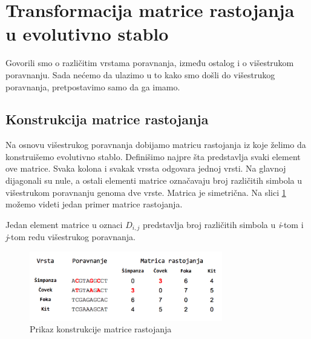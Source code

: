 \section{Transformacija matrice rastojanja u evolutivno stablo}
\label{sec:transformacijamatrice}

Govorili smo o različitim vrstama poravnanja, između ostalog i o višestrukom poravnanju. Sada nećemo da ulazimo u to kako smo došli do višestrukog poravnanja, pretpostavimo samo da ga imamo. 

\subsection{Konstrukcija matrice rastojanja}
\label{subsec:matricarastojanja}

Na osnovu vi\v{s}estrukog poravnanja dobijamo matricu rastojanja iz koje \v{z}elimo da konstrui\v{s}emo evolutivno stablo. Defini\v{s}imo najpre \v{s}ta predstavlja svaki element ove matrice. Svaka kolona i svakak vrssta odgovara jednoj vrsti. Na glavnoj dijagonali su nule, a ostali elementi matrice označavaju broj različitih simbola u višestrukom poravnanju genoma dve vrste. Matrica je simetrična. Na slici \ref{fig:pkmr} možemo videti jedan primer matrice rastojanja. 

\begin{definicija}
Jedan element matrice u oznaci $D_{i,j}$ predstavlja broj razli\v{c}itih simbola u \textit{i}-tom i \textit{j}-tom redu vi\v{s}estrukog poravnanja.
\end{definicija}

\begin{figure}[h!]
\begin{center}
\includegraphics[width=0.75\textwidth]{poglavlja/7/slike/slika2.png}
\end{center}
\caption{Prikaz konstrukcije matrice rastojanja}
\label{fig:pkmr}
\end{figure}

